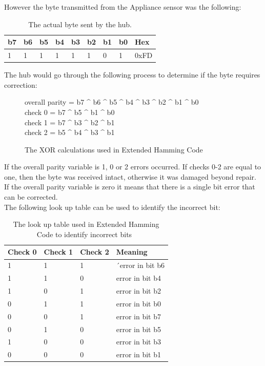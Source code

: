 \documentclass[preprint,12pt,3p]{elsarticle}
\begin{document}
However the byte transmitted from the Appliance sensor was the following:
\begin{table}[H]
\centering
\begin{tabular}{| l | l | l | l | l | l | l | l | l |}
\hline
b7 & b6 & b5 & b4 & b3 & b2 & b1 & b0 & Hex\\ \hline
1 & 1 & 1 & 1 & 1 & 1 & 0 & 1  & 0xFD\\ \hline
\end{tabular}
\caption{The actual byte sent by the hub.}
\label{tab:correctpacket}
\end{table}

The hub would go through the following process to determine if the byte requires correction:\\
\begin{figure}[H]
\centering
overall parity = b7 \^{} b6 \^{} b5 \^{} b4 \^{} b3 \^{} b2 \^{} b1 \^{} b0\\
check 0 = b7 \^{} b5 \^{} b1 \^{} b0\\
check 1 = b7 \^{} b3 \^{} b2 \^{} b1\\
check 2 = b5 \^{} b4 \^{} b3 \^{} b1\\
\caption{The XOR calculations used in Extended Hamming Code~\cite{extendedhamming}}
\label{fig:xorcalcs}
\end{figure}

If the overall parity variable is 1, 0 or 2 errors occurred. If checks 0-2 are equal to one, then the byte was received intact, otherwise it was damaged beyond repair.\\
If the overall parity variable is zero it means that there is a single bit error that can be corrected.\\
The following look up table can be used to identify the incorrect bit:
\begin{table}[H]
\centering
\begin{tabular}{| l | l | l | l |}
\hline
Check 0 & Check 1 & Check 2 & Meaning\\ \hline
1 & 1 & 1 &´error in bit b6\\ \hline
1 & 1 & 0 & error in bit b4\\ \hline
1 & 0 & 1 & error in bit b2\\ \hline
0 & 1 & 1 & error in bit b0\\ \hline
0 & 0 & 1 & error in bit b7\\ \hline
0 & 1 & 0 & error in bit b5\\ \hline
1 & 0 & 0 & error in bit b3\\ \hline
0 & 0 & 0 & error in bit b1\\ \hline
\end{tabular}
\caption{The look up table used in Extended Hamming Code to identify incorrect bits~\cite{extendedhamming}}
\label{tab:paritylookup}
\end{table}
\end{document}
